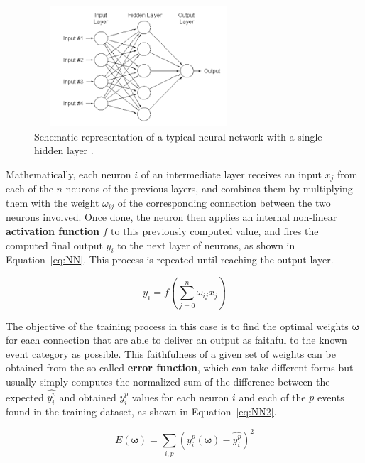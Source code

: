 \documentclass[a4paper, 10pt, openright]{report}
\begin{document}
\begin{figure}[htbp]
\centering
\includegraphics[width=7.8cm, height=4.5cm]{figs/NN.png}
\caption{Schematic representation of a typical neural network with a single hidden layer \cite{NN}.}
\label{fig:NN}
\end{figure}

Mathematically, each neuron $i$ of an intermediate layer receives an input $x_{j}$ from each of the $n$ neurons of the previous layers, and combines them by multiplying them with the weight $\omega_{ij}$ of the corresponding connection between the two neurons involved. Once done, the neuron then applies an internal non-linear \textbf{activation function} $f$ to this previously computed value, and fires the computed final output $y_i$ to the next layer of neurons, as shown in Equation~\ref{eq:NN}. This process is repeated until reaching the output layer.

\begin{equation}
\label{eq:NN}
y_i = f \left (\sum_{j = 0}^n \omega_{ij} x_j \right)
\end{equation}

The objective of the training process in this case is to find the optimal weights $\bm \omega$ for each connection that are able to deliver an output as faithful to the known event category as possible. This faithfulness of a given set of weights can be obtained from the so-called \textbf{error function}, which can take different forms but usually simply computes the normalized sum of the difference between the expected $\hat{y_i^p}$ and obtained $y_i^p$ values for each neuron $i$ and each of the $p$ events found in the training dataset, as shown in Equation~\ref{eq:NN2}.

\begin{equation}
\label{eq:NN2}
E(\bm \omega) = \sum_{i, p} \left (y_i^p(\bm \omega) - \hat{y_i^p} \right)^2
\end{equation}
\end{document}
